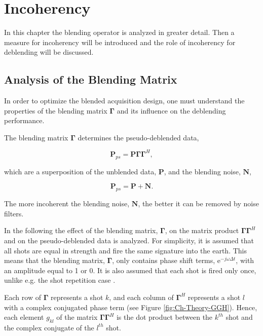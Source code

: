 \chapter{Incoherency} \label{chap:Incoherency}

In this chapter the blending operator is analyzed in greater detail. Then a measure for incoherency will be introduced and the role of incoherency for deblending will be discussed.

\section{Analysis of the Blending Matrix} \label{sec:BlendingMatrix}

In order to optimize the blended acquisition design, one must understand the properties of the blending matrix $\mathbf{\Gamma}$ and its influence on the deblending performance.

The blending matrix $\mathbf{\Gamma}$ determines the pseudo-deblended data,

\begin{equation}
	\mathbf{P}_{ps} = \mathbf{P \Gamma \Gamma}^H,
	\label{eq:Ch-Theory-Pseudo-Deblended-Data}
\end{equation}

which are a superposition of the unblended data, $\mathbf{P}$, and the blending noise, $\mathbf{N}$,

\begin{equation}
	\mathbf{P}_{ps} = \mathbf{P} + \mathbf{N}.
	\label{eq:Ch-Theory-PseudoSuperposition}
\end{equation}

The more incoherent the blending noise, $\mathbf{N}$, the better it can be removed by noise filters.

In the following the effect of the blending matrix, $\mathbf{\Gamma}$, on the matrix product $\mathbf{\Gamma \Gamma}^H$ and on the pseudo-deblended data is analyzed. For simplicity, it is assumed that all shots are equal in strength and fire the same signature into the earth. This means that the blending matrix, $\mathbf{\Gamma}$, only contains phase shift terms, $\mathrm{e}^{-j \omega \Delta t}$, with an amplitude equal to 1 or 0. It is also assumed that each shot is fired only once, unlike e.g. the shot repetition case \citep{Sixue}.

Each row of $\mathbf{\Gamma}$ represents a shot $k$, and each column of $\mathbf{\Gamma}^H$ represents a shot $l$ with a complex conjugated phase term (see Figure \ref{fig:Ch-Theory-GGH}). Hence, each element $g_{kl}$ of the matrix $\mathbf{\Gamma \Gamma}^H$ is the dot product between the $k^{th}$ shot and the complex conjugate of the $l^{th}$ shot.

